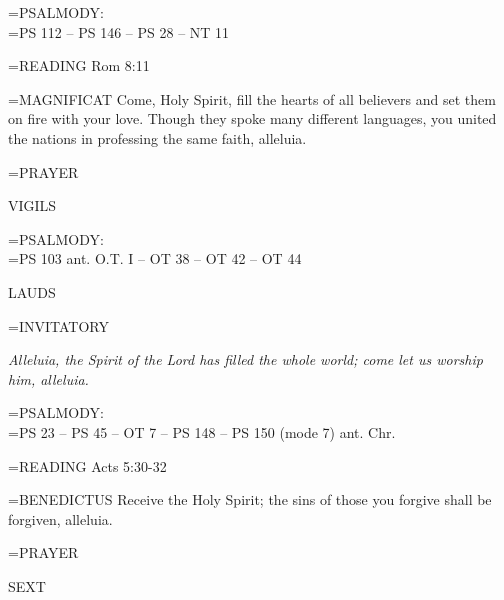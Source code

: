\hangindent=\parindent \small{PSALMODY:}\\
\hangindent=\parindent  PS 112 -- PS 146 -- PS 28 -- NT 11\vspace{0.5em}

\hangindent=\parindent \small{\uppercase{READING}}	Rom 8:11 \textbf{\\}

\hangindent=\parindent \small{MAGNIFICAT 	Come, Holy Spirit, fill the hearts of all believers and set them on fire with your love. Though they spoke many different languages, you united the nations in professing the same faith, alleluia.\\}

\hangindent=\parindent \small{PRAYER 	}

\begin{flushleft}\normalsize VIGILS\\\end{flushleft}

\hangindent=\parindent \small{PSALMODY:}\\
\hangindent=\parindent  PS 103 ant. O.T. I -- OT 38 -- OT 42 -- OT 44\vspace{0.5em}

\begin{flushleft}\normalsize LAUDS\\\end{flushleft}

\hangindent=\parindent \small{INVITATORY}
\begin{center}
\textit{Alleluia, the Spirit of the Lord has filled the whole world; come let us worship him, alleluia.\\}
\end{center}

\hangindent=\parindent \small{PSALMODY:}\\
\hangindent=\parindent  PS 23 -- PS 45 -- OT 7 -- PS 148 -- PS 150 (mode 7) ant. Chr.\vspace{0.5em}

\hangindent=\parindent \small{\uppercase{READING}}	Acts 5:30-32 \textbf{\\}

\hangindent=\parindent \small{BENEDICTUS 	Receive the Holy Spirit; the sins of those you forgive shall be forgiven, alleluia.\\}

\hangindent=\parindent \small{PRAYER 	}

\begin{flushleft}\normalsize SEXT\\\end{flushleft}

